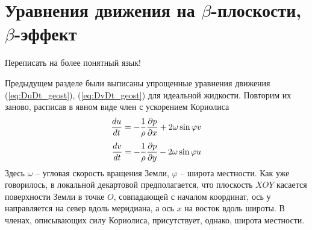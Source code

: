 \section{{\color{done}Уравнения движения на $\beta$-плоскости, $\beta$-эффект}}
    \begin{warn}
        Переписать на более понятный язык!
    \end{warn}
    Предыдущем разделе были выписаны упрощенные уравнения движения (\ref{eq:DuDt_geost}), (\ref{eq:DvDt_geost}) для идеальной жидкости. Повторим их заново, расписав в явном виде член с ускорением Кориолиса
    \begin{equation}
    \label{DuDt_geost_cor}
        \displaystyle\frac{d u}{d t} = -\frac{1}{\rho}\displaystyle\frac{\partial p}{\partial x}+2\omega \sin\varphi v
    \end{equation} 
    \begin{equation}
    \label{DvDt_geost_cor}
        \displaystyle\frac{d v}{d t} = -\frac{1}{\rho}\displaystyle\frac{\partial p}{\partial y}-2\omega \sin\varphi u
    \end{equation} 
    Здесь $\omega$ -- угловая скорость вращения Земли, $\varphi$ -- широта местности.  Как уже говорилось, в локальной декартовой предполагается, что плоскость $XOY$ касается поверхности Земли в точке $O$, совпадающей с началом координат, ось $у$ направляется на север вдоль меридиана, а ось $x$ на восток вдоль широты. В членах, описывающих силу Кориолиса, присутствует, однако, широта местности.
    
